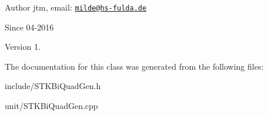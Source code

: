 \begin{DoxyAuthor}{Author}
jtm, email\+:  \href{mailto:milde@hs-fulda.de}{\tt milde@hs-\/fulda.\+de} 
\end{DoxyAuthor}
\begin{DoxySince}{Since}
04-\/2016 
\end{DoxySince}
\begin{DoxyVersion}{Version}
1. 
\end{DoxyVersion}


The documentation for this class was generated from the following files\+:\begin{DoxyCompactItemize}
\item 
include/S\+T\+K\+Bi\+Quad\+Gen.\+h\item 
unit/S\+T\+K\+Bi\+Quad\+Gen.\+cpp\end{DoxyCompactItemize}
